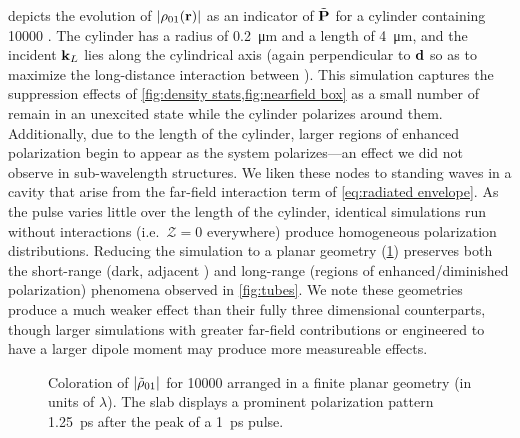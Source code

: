  depicts the evolution of $\abs{\rho_{01}(\vb{r})}$ as an indicator of $\tilde{\vb{P}}$ for a cylinder containing \num{10000} \qds{}.
The cylinder has a radius of \SI{0.2}{\micro\meter} and a length of \SI{4}{\micro\meter}, and the incident $\vb{k}_L$ lies along the cylindrical axis (again perpendicular to $\vb{d}$ so as to maximize the long-distance interaction between \qds{}).
This simulation captures the suppression effects of \cref{fig:density stats,fig:nearfield box} as a small number of \qds{} remain in an unexcited state while the cylinder polarizes around them.
Additionally, due to the length of the cylinder, larger regions of enhanced polarization begin to appear as the system polarizes---an effect we did not observe in sub-wavelength structures.
We liken these nodes to standing waves in a cavity that arise from the far-field interaction term of \cref{eq:radiated envelope}.
As the pulse varies little over the length of the cylinder, identical simulations run without interactions (i.e.~$\mathcal{Z} = 0$ everywhere) produce homogeneous polarization distributions.
Reducing the simulation to a planar geometry (\cref{fig:wide plate}) preserves both the short-range (dark, adjacent \qds{}) and long-range (regions of enhanced/diminished polarization) phenomena observed in \cref{fig:tubes}.
We note these geometries produce a much weaker effect than their fully three dimensional counterparts, though larger simulations with greater far-field contributions or \qds{} engineered to have a larger dipole moment may produce more measureable effects.

\begin{figure}
  \centering
  \caption{\label{fig:wide plate}
    Coloration of $\abs{\tilde{\rho}_{01}}$ for \num{10000} \qds{} arranged in a finite planar geometry (in units of $\lambda$).
    The slab displays a prominent polarization pattern \SI{1.25}{\pico\second} after the peak of a \SI{1}{\pico\second} pulse.
  }
\end{figure}

